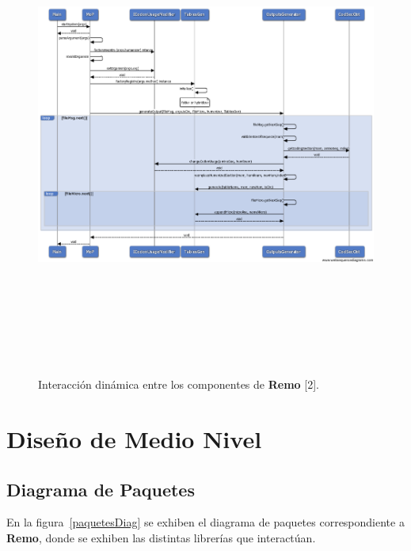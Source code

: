 \begin{figure}[!hbtp]
	\begin{center}
		\includegraphics[width=20cm, height=16cm, angle=90]{image/remoCompDin.png}
		\caption{Interacción dinámica entre los componentes de \textbf{Remo} [2].}
		\label{compDinamico}
	\end{center}
\end{figure}

\section{Diseño de Medio Nivel}
\subsection{Diagrama de Paquetes}
\par En la figura~\ref{paquetesDiag} se exhiben el diagrama de paquetes correspondiente a \textbf{Remo}, donde se exhiben las distintas librerías que interactúan.

